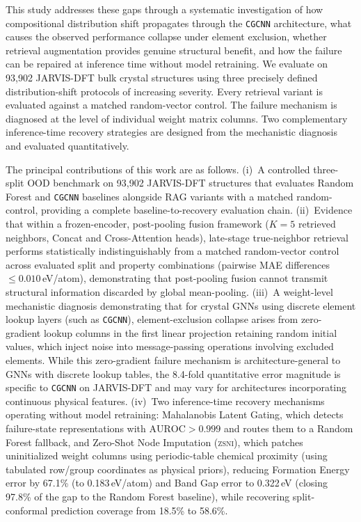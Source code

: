 \documentclass[final,5p,twocolumn,10pt]{elsarticle}
\newcommand{\auroc}{\text{AUROC}}
\newcommand{\cgcnn}{\texttt{CGCNN}}
\newcommand{\zsni}{\textsc{zsni}}
\begin{document}
This study addresses these gaps through a systematic investigation of
how compositional distribution shift propagates through the \cgcnn{}
architecture, what causes the observed performance collapse under element
exclusion, whether retrieval augmentation provides genuine structural
benefit, and how the failure can be repaired at inference time without
model retraining. We evaluate on 93,902 JARVIS-DFT bulk crystal structures
using three precisely defined distribution-shift protocols of increasing
severity. Every retrieval variant is evaluated against a matched
random-vector control. The failure mechanism is diagnosed at the level of
individual weight matrix columns. Two complementary inference-time recovery
strategies are designed from the mechanistic diagnosis and evaluated
quantitatively.

The principal contributions of this work are as follows. (i)~A
controlled three-split OOD benchmark on 93,902 JARVIS-DFT structures
that evaluates Random Forest and \cgcnn{} baselines alongside RAG variants
with a matched random-control, providing a complete baseline-to-recovery
evaluation chain. (ii)~Evidence that within a frozen-encoder, post-pooling fusion framework
($K=5$ retrieved neighbors, Concat and Cross-Attention heads), late-stage
true-neighbor retrieval performs statistically indistinguishably from a matched random-vector control
across evaluated split and property combinations (pairwise MAE differences
$\le 0.010$\,eV/atom), demonstrating that post-pooling fusion cannot transmit
structural information discarded by global mean-pooling.
(iii)~A weight-level mechanistic diagnosis demonstrating that for crystal GNNs using
discrete element lookup layers (such as \cgcnn{}), element-exclusion collapse arises from
zero-gradient lookup columns in the first linear projection retaining random initial values,
which inject noise into message-passing operations involving excluded elements. While this
zero-gradient failure mechanism is architecture-general to GNNs with discrete lookup tables,
the 8.4-fold quantitative error magnitude is specific to \cgcnn{} on JARVIS-DFT and may vary for
architectures incorporating continuous physical features.
(iv)~Two inference-time recovery mechanisms operating without model retraining:
Mahalanobis Latent Gating, which detects failure-state representations
with $\auroc{} > 0.999$ and routes them to a Random Forest fallback, and
Zero-Shot Node Imputation (\zsni{}), which patches uninitialized weight
columns using periodic-table chemical proximity (using tabulated row/group
coordinates as physical priors), reducing Formation Energy error by 67.1\%
(to 0.183\,eV/atom) and Band Gap error to 0.322\,eV (closing 97.8\% of the gap
to the Random Forest baseline), while recovering split-conformal prediction
coverage from 18.5\% to 58.6\%.
\end{document}
